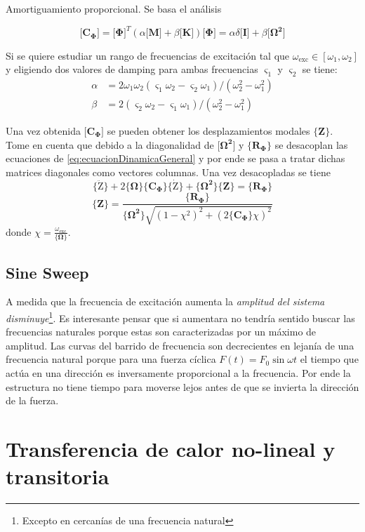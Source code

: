 \documentclass[11pt, a4paper,titlepage]{article}
\newcommand{\Phib}{\boldsymbol{\Phi}}
\newcommand{\Omegab}{\boldsymbol{\Omega}}
\newcommand{\COmega}{\Cme{\Omegab}}
\newcommand{\Mme}[1]{\boldsymbol{[}\mathbf{#1} \boldsymbol{]}}
\newcommand{\Cme}[1]{\boldsymbol{\{ }\mathbf{#1} \boldsymbol{\}} }
\newcommand{\modal}{{_{\Phib}}}
\newcommand{\dampfact}{\varsigma}
\begin{document}
Amortiguamiento proporcional. Se basa el análisis 

\begin{equation}
	\Mme{C\modal} = \Mme{\Phib}^T ( \alpha \Mme{M}+\beta \Mme{K})\Mme{\Phib} = \alpha \delta \Mme{I} +\beta \Mme{\Omegab^2}
\end{equation}

Si se quiere estudiar un rango de frecuencias de excitación tal que $\omega_{\mathrm{exc}}\in [\omega_1, \omega_2]$ y eligiendo dos valores de damping para ambas frecuencias $\dampfact_1$ y $\dampfact_2$ se tiene:
\begin{align*}
\alpha &= 2\omega_1 \omega_2 (\dampfact_1 \omega_2 -\dampfact_2 \omega_1)/(\omega_2^2 - \omega_1^2) \\ \beta &= 2(\dampfact_2\omega_2 -\dampfact_1 \omega_1)/(\omega_2^2 - \omega_1^2)
\end{align*}

Una vez obtenida $\Mme{C\modal}$ se pueden obtener los desplazamientos modales $\Cme{Z}$. Tome en cuenta que debido a la diagonalidad de $\Mme{\Omegab^2}$ y $\Cme{R\modal }$ se desacoplan las ecuaciones de \ref{eq:ecuacionDinamicaGeneral} y por ende se pasa a tratar dichas matrices diagonales como vectores columnas. Una vez desacopladas se tiene
 \[\Cme{\boldsymbol{\ddot{\mathrm{Z}}}}+2\COmega \Cme{C\modal} \Cme{\boldsymbol{\dot{\mathrm{Z}}}} + \Cme{\Omegab^2} \Cme{Z} = \Cme{R\modal} \]
\[
\Cme{Z} = \frac{\Cme{R\modal }}{ \Cme{\Omegab^2} \sqrt{(1-\chi^2)^2 + (2 \Cme{C\modal} \chi)^2}}
\]
donde $\chi = \frac{\omega_{\mathrm{exc}}}{\COmega}$. 



\subsection*{Sine Sweep}
A medida que la frecuencia de excitación aumenta la \textit{amplitud del sistema disminuye}\footnote{Excepto en cercanías de una frecuencia natural}. Es interesante pensar que si aumentara no tendría sentido buscar las frecuencias naturales porque estas son caracterizadas por un máximo de amplitud. Las curvas del barrido de frecuencia son decrecientes en lejanía de una frecuencia natural porque para una fuerza cíclica $F(t)=F_0\sin \omega t$ el tiempo que actúa en una dirección es inversamente proporcional a la frecuencia. Por ende la estructura no tiene tiempo para moverse lejos antes de que se invierta la dirección de la fuerza.

\section{Transferencia de calor no-lineal y transitoria}
\end{document}

